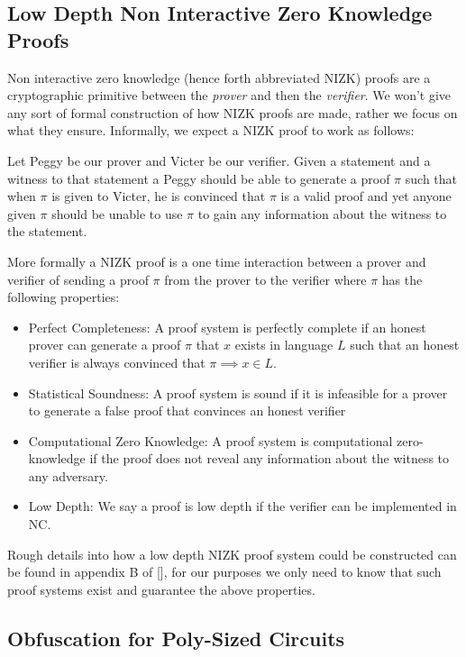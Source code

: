 \documentclass[12pt,twoside]{reedthesis}
\begin{document}
       \subsection{Low Depth Non Interactive Zero Knowledge Proofs}
       
       Non interactive zero knowledge (hence forth abbreviated NIZK) proofs are a cryptographic primitive between the \textit{prover} and then the \textit{verifier}. We won't give any sort of formal construction of how NIZK proofs are made, rather we focus on what they ensure. Informally, we expect a NIZK proof to work as follows:
       \par Let Peggy be our prover and Victer be our verifier. Given a statement and a witness to that statement a Peggy should be able to generate a proof $\pi$ such that when $\pi$ is given to Victer, he is convinced that $\pi$ is a valid proof and yet anyone given $\pi$ should be unable to use $\pi$ to gain any information about the witness to the statement.
       \par More formally a NIZK proof is a one time interaction between a prover and verifier of sending a proof $\pi$ from the prover to the verifier where $\pi$ has the following properties:
       \begin{itemize}
       \item Perfect Completeness: A proof system is perfectly complete if an honest prover can generate a proof $\pi$ that $x$ exists in language $L$ such that an honest verifier is always convinced that $\pi \implies x\in L$.
       \item Statistical Soundness: A proof system is sound if it is infeasible for a prover to generate a false proof that convinces an honest verifier
       \item Computational Zero Knowledge: A proof system is computational zero-knowledge if the proof does not reveal any information about the witness to any adversary.
       \item Low Depth: We say a proof is low depth if the verifier can be implemented in NC.
         \end{itemize}
    
    
    \par Rough details into how a low depth NIZK proof system could be constructed can be found in appendix B of [\cite{Garg:2013}], for our purposes we only need to know that such proof systems exist and guarantee the above properties.
    
    \subsection{Obfuscation for Poly-Sized Circuits}
    
\end{document}
